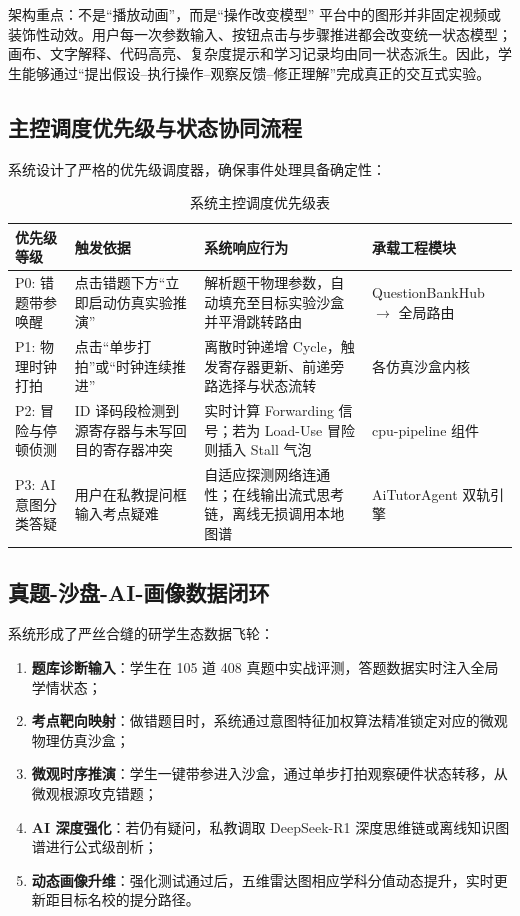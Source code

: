 \documentclass[UTF8,a4paper,11pt]{ctexart}
\begin{document}
\begin{keypointbox}{架构重点：不是“播放动画”，而是“操作改变模型”}
平台中的图形并非固定视频或装饰性动效。用户每一次参数输入、按钮点击与步骤推进都会改变统一状态模型；画布、文字解释、代码高亮、复杂度提示和学习记录均由同一状态派生。因此，学生能够通过“提出假设--执行操作--观察反馈--修正理解”完成真正的交互式实验。
\end{keypointbox}

\subsection{主控调度优先级与状态协同流程}
系统设计了严格的优先级调度器，确保事件处理具备确定性：

\begin{table}[htbp]
\centering
\small
\caption{系统主控调度优先级表}
\begin{tabularx}{\textwidth}{p{3.2cm}p{3.8cm}Xp{2.8cm}}
\toprule
\textbf{优先级等级} & \textbf{触发依据} & \textbf{系统响应行为} & \textbf{承载工程模块} \\
\midrule
P0: 错题带参唤醒 & 点击错题下方“立即启动仿真实验推演” & 解析题干物理参数，自动填充至目标实验沙盒并平滑跳转路由 & QuestionBankHub $\rightarrow$ 全局路由 \\
P1: 物理时钟打拍 & 点击“单步打拍”或“时钟连续推进” & 离散时钟递增 Cycle，触发寄存器更新、前递旁路选择与状态流转 & 各仿真沙盒内核 \\
P2: 冒险与停顿侦测 & ID 译码段检测到源寄存器与未写回目的寄存器冲突 & 实时计算 Forwarding 信号；若为 Load-Use 冒险则插入 Stall 气泡 & cpu-pipeline 组件 \\
P3: AI 意图分类答疑 & 用户在私教提问框输入考点疑难 & 自适应探测网络连通性；在线输出流式思考链，离线无损调用本地图谱 & AiTutorAgent 双轨引擎 \\
\bottomrule
\end{tabularx}
\end{table}

\subsection{真题-沙盘-AI-画像数据闭环}
系统形成了严丝合缝的研学生态数据飞轮：
\begin{enumerate}
    \item \textbf{题库诊断输入}：学生在 105 道 408 真题中实战评测，答题数据实时注入全局学情状态；
    \item \textbf{考点靶向映射}：做错题目时，系统通过意图特征加权算法精准锁定对应的微观物理仿真沙盒；
    \item \textbf{微观时序推演}：学生一键带参进入沙盒，通过单步打拍观察硬件状态转移，从微观根源攻克错题；
    \item \textbf{AI 深度强化}：若仍有疑问，私教调取 DeepSeek-R1 深度思维链或离线知识图谱进行公式级剖析；
    \item \textbf{动态画像升维}：强化测试通过后，五维雷达图相应学科分值动态提升，实时更新距目标名校的提分路径。
\end{enumerate}
\end{document}
